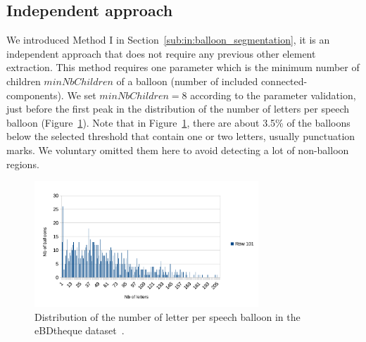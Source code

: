 

\subsection{Independent approach} %

We introduced Method I in Section~\ref{sub:in:balloon_segmentation}, it is an independent approach that does not require any previous other element extraction.
This method requires one parameter which is the minimum number of children $minNbChildren$ of a balloon (number of included connected-components).
We set $minNbChildren=8$ according to the parameter validation, just before the first peak in the distribution of the number of letters per speech balloon (Figure~\ref{fig:ex:min_number_children_validation}).
Note that in Figure~\ref{fig:ex:min_number_children_validation}, there are about 3.5\% of the balloons below the selected threshold that contain one or two letters, usually punctuation marks.
We voluntary omitted them here to avoid detecting a lot of non-balloon regions.

    \begin{figure}[h]%
      \centering
      \includegraphics[trim= 10px 0px 60px 0px, clip, width=0.75\textwidth]{number_of_letter_per_balloon.pdf}
      \caption[Distribution of the number of letter per speech balloon]{Distribution of the number of letter per speech balloon in the eBDtheque dataset~\cite{Guerin2013}.
      }
      \label{fig:ex:min_number_children_validation}
    \end{figure}  


